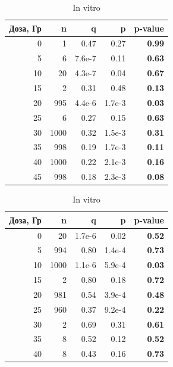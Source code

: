 \documentclass[12pt, specialist, subf, substylefile = spbu.rtx]{disser}
\begin{document}
	\begin{table}[ht]
		\centering
		\caption*{Оценки параметров и значимости критерия хи-квадрат логарифмически-биномиального распределения.}
		\small
		\begin{minipage}{0.48\textwidth}
			\centering
			\caption{In vivo}
			
			\begin{tabular}{rrrrr}
				\hline
				Доза, Гр & n & q & p & \textbf{p-value} \\ 
				\hline
				0 & 1 & 0.47 & 0.27 & \textbf{0.99} \\ 
				5 & 6 & 7.6e-7 & 0.11 & \textbf{0.63} \\ 
				10 & 20 & 4.3e-7 & 0.04 & \textbf{0.67} \\ 
				15 & 2 & 0.31 & 0.48 & \textbf{0.13} \\ 
				20 & 995 & 4.4e-6 & 1.7e-3 & \textbf{0.03} \\ 
				25 & 6 & 0.27 & 0.15 & \textbf{0.63} \\ 
				30 & 1000 & 0.32 & 1.5e-3 & \textbf{0.31} \\ 
				35 & 998 & 0.19 & 1.7e-3 & \textbf{0.11} \\ 
				40 & 1000 & 0.22 & 2.1e-3 & \textbf{0.16} \\
				45 & 998 & 0.18 & 2.3e-3 & \textbf{0.08} \\ 
				\hline
			\end{tabular}
			\label{tab:logbinomvivo}
		\end{minipage}
		\hfill
		\begin{minipage}{0.48\textwidth}
			\centering
			\caption{In vitro}
			
			\begin{tabular}{rrrrr}
				\hline
				Доза, Гр & n & q & p & \textbf{p-value} \\ 
				\hline
				0 & 20 & 1.7e-6 & 0.02 & \textbf{0.52} \\ 
				5 & 994 & 0.80 & 1.4e-4 & \textbf{0.73} \\ 
				10 & 1000 & 1.1e-6 & 5.9e-4 & \textbf{0.03} \\ 
				15 & 2 & 0.80 & 0.18 & \textbf{0.72} \\ 
				20 & 981 & 0.54 & 3.9e-4 & \textbf{0.48} \\ 
				25 & 960 & 0.37 & 9.2e-4 & \textbf{0.22} \\ 
				30 & 2 & 0.69 & 0.31 & \textbf{0.61} \\ 
				35 & 8 & 0.52 & 0.12 & \textbf{0.52} \\ 
				40 & 8 & 0.43 & 0.16 & \textbf{0.73} \\
				\hline
			\end{tabular}
			\label{tab:logbinomvitro}
		\end{minipage}
		\label{tab:logbinom}
	\end{table}
\end{document}
